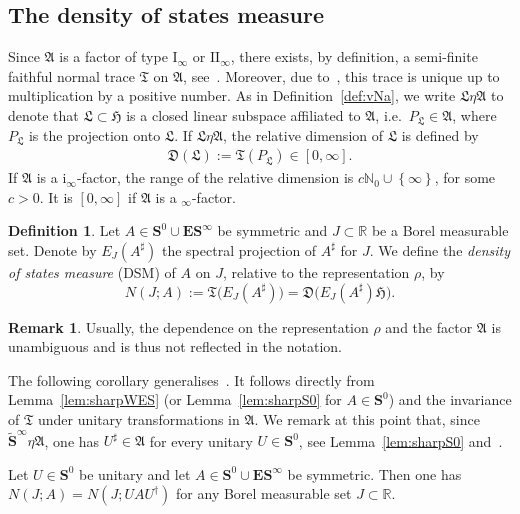 \documentclass[10pt]{amsart}
\theoremstyle{definition}\newtheorem{defi}[theo]{Definition}\newtheorem{rema}[theo]{Remark}\newtheorem{exam}[theo]{Example}\newtheorem{nota}[theo]{Notation}
\newcommand{\rmI}{\mathrm{I}}
\newcommand{\rmi}{\mathrm{i}}
\newcommand{\rmII}{\mathrm{II}}
\newcommand{\R}{\mathbb R}
\newcommand{\N}{\mathbb N}
\newcommand{\BE}{\mathbf E}
\newcommand{\BS}{\mathbf S}
\newcommand{\FA}{\mathfrak A}
\newcommand{\FD}{\mathfrak D}
\newcommand{\FH}{\mathfrak H}
\newcommand{\FL}{\mathfrak L}
\newcommand{\FT}{\mathfrak T}
\renewcommand{\subseteq}{\subset}
\newcommand{\set}[1]{\left\{ #1 \right\}}
\begin{document}
\subsection{The density of states measure}\label{sec:dsm}

Since $\FA$ is a factor of type $\rmI_\infty$ or $\rmII_\infty$, there exists, by definition, a semi-finite faithful normal trace $\FT$ on $\FA$, see~\cite[I.6 and I.8.4]{Dixmier}. Moreover, due to~\cite[I.6.4, Corollary]{Dixmier}, this trace is unique up to multiplication by a positive number. As in Definition~\ref{def:vNa}, we write $\FL\eta\FA$ to denote that $\FL\subset \FH$ is a closed linear subspace affiliated to $\FA$, i.e.~$P_{\FL}\in\FA$, where $P_\FL$ is the projection onto $\FL$. If $\FL\eta \FA$, the relative dimension of $\FL$ is defined by
\begin{align*}
\FD(\FL):=\FT(P_{\FL})\in [0,\infty].
\end{align*}
If $\FA$ is a $\rmi_\infty$-factor, the range of the relative dimension is $c\N_0\cup\set{\infty}$, for some $c>0$. It is $[0,\infty]$ if $\FA$ is a $_\infty$-factor.

\begin{defi}
Let $A\in\BS^0\cup\BE\BS^\infty$ be symmetric and $J\subseteq \R$ be a Borel measurable set. Denote by $E_J(A^\sharp)$ the spectral projection of $A^\sharp$ for $J$. We define the \emph{density of states measure} (DSM) of $A$ on $J$, relative to the representation $\rho$, by
\begin{equation}
N(J; A) := \FT\big(E_J(A^\sharp)\big)=\FD\big(E_J(A^\sharp)\FH\big).\label{eq:dfnids}
\end{equation}
\end{defi}


\begin{rema}\label{rem:iiinfinityfactor}
Usually, the dependence on the representation $\rho$ and the factor $\FA$ is unambiguous and is thus not reflected in the notation.
\end{rema}
The following corollary generalises~\cite[Lemma~4.4]{ParSht2012}. It follows directly from Lemma~\ref{lem:sharpWES} (or Lemma~\ref{lem:sharpS0} for $A\in\BS^0$) and the invariance of $\FT$ under unitary transformations in $\FA$. We remark at this point that, since $\widetilde{\BS}^\infty\eta\FA$, one has $U^\sharp\in\FA$ for every unitary $U\in\BS^0$, see Lemma~\ref{lem:sharpS0} and~\cite[\S 35.1]{Naimark}.
\begin{coro} \label{cor:unitary}
Let $U\in\BS^0$ be unitary and let $A\in\BS^0\cup\BE\BS^\infty$ be symmetric. Then one has $N(J;A) = N(J;U A U^\dagger)$ for any Borel measurable set $J\subseteq \R$.
\end{coro}
\end{document}
